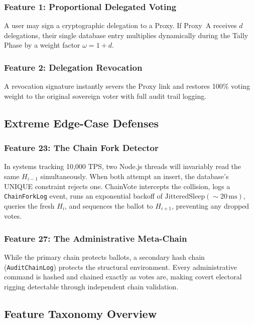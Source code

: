 \documentclass[journal,10pt,twocolumn]{IEEEtran}
\begin{document}
\subsubsection{Feature 1: Proportional Delegated Voting}
A user may sign a cryptographic delegation to a Proxy. If Proxy~A receives $d$ delegations, their single database entry multiplies dynamically during the Tally Phase by a weight factor $\omega = 1 + d$.

\subsubsection{Feature 2: Delegation Revocation}
A revocation signature instantly severs the Proxy link and restores 100\% voting weight to the original sovereign voter with full audit trail logging.

\subsection{Extreme Edge-Case Defenses}

\subsubsection{Feature 23: The Chain Fork Detector}
In systems tracking 10,000 TPS, two Node.js threads will invariably read the same $H_{i-1}$ simultaneously. When both attempt an insert, the database's UNIQUE constraint rejects one. ChainVote intercepts the collision, logs a \texttt{ChainForkLog} event, runs an exponential backoff of $\mathrm{JitteredSleep}(\sim\!20\,\mathrm{ms})$, queries the fresh $H_i$, and sequences the ballot to $H_{i+1}$, preventing any dropped votes.

\subsubsection{Feature 27: The Administrative Meta-Chain}
While the primary chain protects ballots, a secondary hash chain (\texttt{AuditChainLog}) protects the structural environment. Every administrative command is hashed and chained exactly as votes are, making covert electoral rigging detectable through independent chain validation.

\subsection{Feature Taxonomy Overview}
\end{document}
